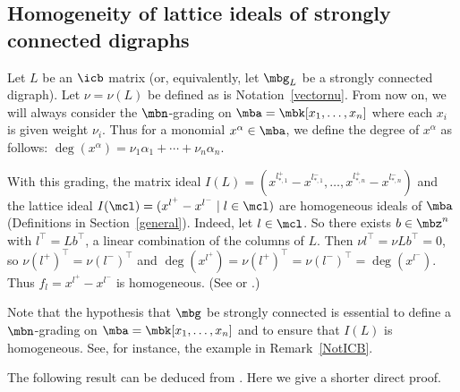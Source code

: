 \subsection{Homogeneity of lattice ideals of strongly connected digraphs}
\label{hom-scd}\phantom{+}%

\begin{assumption}\label{grading}
Let $L$ be an $\icb$ matrix (or, equivalently, let $\mbg_L$ be a
strongly connected digraph). Let $\nu=\nu(L)$ be defined as is
Notation~\ref{vectornu}. From now on, we will always consider the
$\mbn$-grading on $\mba=\mbk[x_1,\ldots ,x_n]$ where each $x_i$ is
given weight $\nu_i$. Thus for a monomial $x^\alpha\in \mba$, we
define the degree of $x^\alpha$ as follows:
$\deg(x^\alpha)=\nu_1\alpha_1+\cdots+\nu_n\alpha_n$.
\end{assumption}

\begin{remark}\label{ILhomogeneous}
With this grading, the matrix ideal
$I(L)=(x^{l_{*,1}^+}-x^{l_{*,1}^-},\ldots
,x^{l_{*,n}^+}-x^{l_{*,n}^-})$ and the lattice ideal
$I(\mcl)=(x^{l^+}-x^{l^-}\mid l\in\mcl)$ are homogeneous ideals of
$\mba$ (\cf Definitions in Section~\ref{general}). Indeed, let
$l\in\mcl$. So there exists $b\in \mbz^n$ with $l^{\top}=Lb^{\top}$, a
linear combination of the columns of $L$.  Then $\nu l^{\top}=\nu
Lb^{\top}=0$, so $\nu (l^{+})^{\top}=\nu (l^{-})^{\top}$ and
$\deg(x^{l^{+}})=\nu (l^{+})^{\top}=\nu
(l^-)^{\top}=\deg(x^{l^-})$. Thus $f_l=x^{l^+}-x^{l^-}$ is
homogeneous. (See \cite[Definition~2.2]{op} or
\cite[Remark~5.6]{opv}.)
\end{remark}

Note that the hypothesis that $\mbg$ be strongly connected is
essential to define a $\mbn$-grading on $\mba=\mbk[x_1,\ldots ,x_n]$
and to ensure that $I(L)$ is homogeneous. See, for instance, the
example in Remark~\ref{NotICB}.

The following result can be deduced from
\cite[Proposition~7.6]{opv}. Here we give a shorter direct proof.

